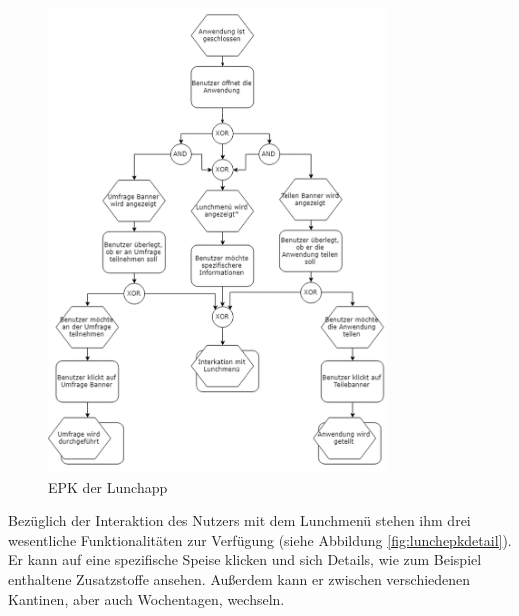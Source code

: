 \begin{figure}[H]
\centering
\includegraphics[width=0.8\textwidth]{images/lunchapp_epk}
\caption[EPK der Lunchapp]{EPK der Lunchapp}
\label{fig:lunchepk}
\end{figure}

Bezüglich der Interaktion des Nutzers mit dem Lunchmenü stehen ihm drei wesentliche Funktionalitäten zur Verfügung (siehe Abbildung \ref{fig:lunchepkdetail}). Er kann auf eine spezifische Speise klicken und sich Details, wie zum Beispiel enthaltene Zusatzstoffe ansehen. Außerdem kann er zwischen verschiedenen Kantinen, aber auch Wochentagen, wechseln.

